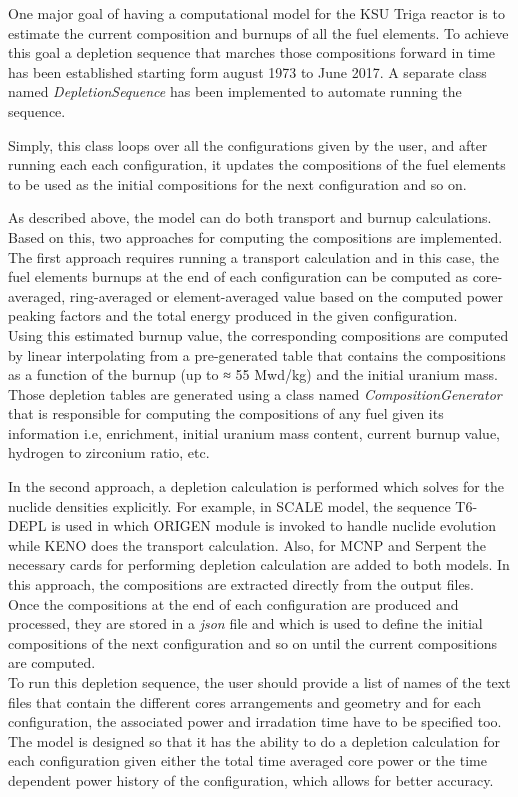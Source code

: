 \documentclass[review]{elsarticle}
\begin{document}
One major goal of having a computational model for the KSU Triga reactor is to estimate the current composition and burnups of all the fuel elements. To achieve this goal a depletion sequence that marches those compositions forward in time has been established starting form august 1973 to June 2017.
A separate class named \emph{DepletionSequence} has been implemented to automate running the sequence. 

Simply, this class loops over all the configurations given by the user, and after running each each configuration, it updates the compositions of the fuel elements to be used as the initial compositions for the next configuration and so on.

As described above, the model can do both transport and burnup calculations. Based on this, two approaches for computing the compositions are implemented.\\
 The first approach requires running a transport calculation and in this case, the fuel elements burnups at the end of each configuration can be computed as core-averaged, ring-averaged or element-averaged value based on the computed power peaking factors and the total energy produced in the given configuration. \\
Using this estimated burnup value, the corresponding compositions are
computed by linear interpolating from a pre-generated table that contains the compositions as
a function of the burnup (up to ≈ 55 Mwd/kg) and the initial uranium mass.
Those depletion tables are generated using a class named \emph{CompositionGenerator} that is responsible for computing the compositions of any fuel given its information i.e, enrichment, initial uranium mass content, current burnup value, hydrogen to zirconium ratio, etc.

In the second approach, a depletion calculation is performed which solves for the nuclide densities explicitly. For example, in SCALE model, the sequence T6-DEPL is used in which ORIGEN module is invoked to handle nuclide evolution while KENO does the transport calculation.
Also, for MCNP and Serpent the necessary cards for performing depletion calculation are added to both models. In this approach, the compositions are extracted directly from the output files. \\
Once the compositions at the end of each configuration are produced and processed, they are stored in a \emph{json} file and which is used to define the initial compositions of the next configuration and so on until the current compositions are computed.\\
To run this depletion sequence, the user should provide a list of names of the text files that contain the different cores arrangements and geometry and for each configuration, the associated power and irradation time have to be specified too. The model is designed so that it has the ability to do a depletion calculation for each configuration given either the total time averaged core power or the time dependent power history of the configuration, which allows for better accuracy.
\end{document}
